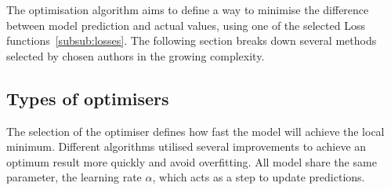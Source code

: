 The optimisation algorithm aims to define a way to minimise the difference between model prediction and actual values, using one of the selected Loss functions~\ref{subsub:losses}.
The following section breaks down several methods selected by chosen authors in the growing complexity.
\subsection{Types of optimisers}
The selection of the optimiser defines how fast the model will achieve the local minimum.
Different algorithms utilised several improvements to achieve an optimum result more quickly and avoid overfitting.
All model share the same parameter, the learning rate $\alpha$, which acts as a step to update predictions.



